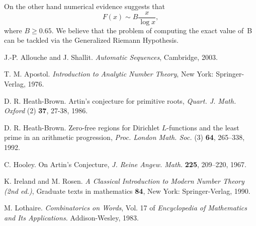 \documentclass{elsart}
\begin{document}
On the other hand numerical evidence suggests that
\[
F(x)\sim B  \frac x{\log x},
\]
where $ B\geq 0.65$. We believe that the problem
of computing the exact value of~B can be tackled via the Generalized
Riemann Hypothesis.





\begin{thebibliography}{9}

J.-P. Allouche and J. Shallit. \emph{Automatic Sequences}, Cambridge, 2003.

T. M. Apostol. \emph{Introduction to Analytic Number Theory}, New York:
Springer-Verlag, 1976.


D. R. Heath-Brown. Artin's conjecture for primitive roots, \emph{Quart. J. Math. Oxford} (2) {\bf 37}, 27-38, 1986.

D. R. Heath-Brown. Zero-free regions for Dirichlet $L$-functions and the least prime in an arithmetic progression,
\emph{Proc. London Math. Soc.} (3)  {\bf 64}, 265--338,  1992.

C. Hooley. On Artin's Conjecture, \emph{J. Reine Angew. Math.} {\bf 225},
209--220, 1967.

K. Ireland and M. Rosen. \emph{A Classical Introduction to Modern Number Theory (2nd ed.)},
Graduate texts in mathematics {\bf 84}, New York: Springer-Verlag, 1990.

M. Lothaire. \emph{Combinatorics on Words}, Vol. 17 of \emph{Encyclopedia of
 Mathematics and Its Applications.} Addison-Wesley, 1983.

\end{thebibliography}
\end{document}
